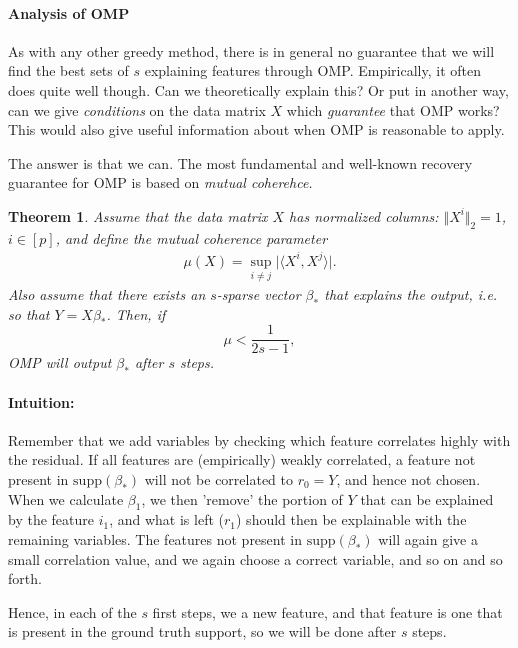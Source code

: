 \documentclass{article}
\newcommand{\sprod}[1]{\langle #1 \rangle}
\newtheorem{theorem}{Theorem}
\newcommand{\abs}[1]{\vert #1 \vert}
\newcommand{\norm}[1]{\Vert #1 \Vert}
\begin{document}
\paragraph{Analysis of OMP}
As with any other greedy method, there is in general no guarantee that we will find the best sets of $s$ explaining features through OMP. Empirically, it often does quite well though. Can we theoretically explain this? Or put in another way, can we give \emph{conditions} on the data matrix $X$ which \emph{guarantee} that OMP works? This would also give useful information about when OMP is reasonable to apply.

The answer is that we can. The most fundamental and well-known recovery guarantee for OMP is based on \emph{mutual coherehce.}
\begin{theorem} \label{th:OMP}
    Assume that the data matrix $X$ has normalized columns: $\norm{X^i}_2=1$, $i\in [p]$, and define the \emph{mutual coherence} parameter
    \begin{align*}
        \mu(X) = \sup_{i \neq j } \abs{\sprod{X^i,X^j}}.
    \end{align*}
    Also assume that there exists an $s$-sparse vector $\beta_*$ that explains the output, i.e. so that $Y=X\beta_*$. Then, if $$\mu < \frac{1}{2s-1},$$ OMP will output $\beta_*$ after $s$ steps. 
\end{theorem}
\paragraph{Intuition:} Remember that we add variables by checking which feature correlates highly with the residual. If all features are (empirically) weakly correlated, a feature not present in $\mathrm{supp}(\beta_*)$ will not be correlated to $r_0=Y$, and hence not chosen. When we calculate $\beta_1$, we then 'remove' the portion of $Y$ that can be explained by the feature $i_1$, and what is left ($r_1$) should then be explainable with the remaining variables. The features not present in $\mathrm{supp}(\beta_*)$ will again give a small correlation value, and we again choose a correct variable, and so on and so forth. 

Hence, in each of the $s$ first steps, we a new feature, and that feature is one that is present in the ground truth support, so we will be done after $s$ steps.
\end{document}
